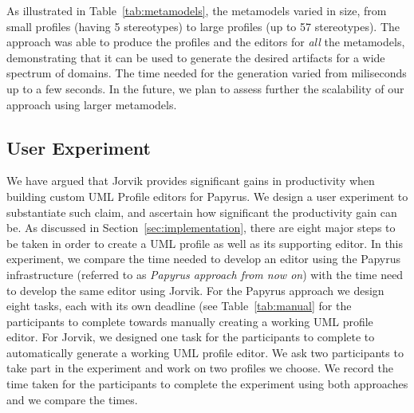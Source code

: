 As illustrated in Table~\ref{tab:metamodels}, the metamodels varied in size, from small profiles (having 5 stereotypes) to large profiles (up to 57 
stereotypes). 
The approach was able to produce the profiles and the editors for \textit{all} the metamodels, demonstrating that it can be used to generate the 
desired artifacts for a wide spectrum of domains. 
The time needed for the generation varied from miliseconds up to a few seconds. 
In the future, we plan to assess further the scalability of our approach using larger metamodels.

\subsection{User Experiment}
We have argued that Jorvik provides significant gains in productivity when building custom UML Profile editors for Papyrus.
We design a user experiment to substantiate such claim, and ascertain how significant the productivity gain can be.
As discussed in Section~\ref{sec:implementation}, there are eight major steps to be taken in order to create a UML profile as well as its supporting editor. 
In this experiment, we compare the time needed to develop an editor using the Papyrus infrastructure (referred to as \textit{Papyrus approach from now on}) with the time need to develop the same editor using Jorvik.
For the Papyrus approach we design eight tasks, each with its own deadline (see Table~\ref{tab:manual} for the participants to complete towards manually creating a working UML profile editor.
For Jorvik, we designed one task for the participants to complete to automatically generate a working UML profile editor.
We ask two participants to take part in the experiment and work on two profiles we choose. 
We record the time taken for the participants to complete the experiment using both approaches and we compare the times.

